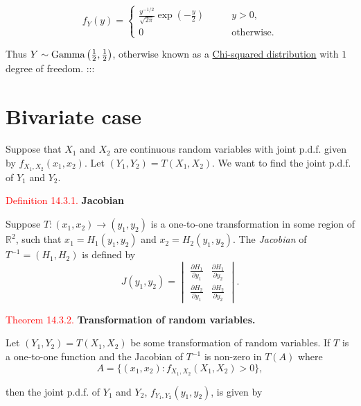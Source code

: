 \documentclass[
]{book}
\begin{document}
\[ f_Y (y) = \left\{ \begin{array}{ll} \frac{y^{-1/2}}{\sqrt{2 \pi}} \exp \left( - \frac{y}{2} \right) \qquad & y>0, \\
0 & \mbox{otherwise.} \end{array} \right.\]

Thus \(Y \sim {\rm Gamma} \left( \frac{1}{2},\frac{1}{2} \right)\), otherwise known as a \protect\hyperlink{rv:exponential:chi}{Chi-squared distribution} with \(1\) degree of freedom.
:::

\hypertarget{Transform:bivariate}{%
\section{Bivariate case}\label{Transform:bivariate}}

Suppose that \(X_1\) and \(X_2\) are continuous random variables with joint p.d.f. given by \(f_{X_1,X_2}(x_1,x_2)\). Let \((Y_1,Y_2)=T(X_1,X_2)\). We want to find the joint p.d.f. of \(Y_1\) and \(Y_2\).

\leavevmode{}%
\textcolor{red}{Definition 14.3.1.}
{\textbf{Jacobian}}

Suppose \(T:(x_1,x_2) \rightarrow (y_1,y_2)\) is a one-to-one transformation in some region of \(\mathbb{R}^2\), such that \(x_1 = H_1(y_1,y_2)\) and \(x_2 = H_2(y_1,y_2)\). The \emph{Jacobian} of \(T^{-1}=(H_1,H_2)\) is defined by\\

\[ J(y_1,y_2) = \begin{vmatrix} \frac{\partial H_1}{\partial y_1} & \frac{\partial H_1}{\partial y_2} \\[4pt]
\frac{\partial H_2}{\partial y_1} & \frac{\partial H_2}{\partial y_2} \end{vmatrix} .\]

\leavevmode{}%
\textcolor{red}{Theorem 14.3.2.}
{\textbf{Transformation of random variables.}}

Let \((Y_1,Y_2)=T(X_1,X_2)\) be some transformation of random variables. If \(T\) is a one-to-one function and the Jacobian of \(T^{-1}\) is non-zero in \(T(A)\) where\\

\[A=\{(x_1,x_2): f_{X_1,X_2}(X_1, X_2)>0\},\]

then the joint p.d.f. of \(Y_1\) and \(Y_2\), \(f_{Y_1,Y_2}(y_1,y_2)\), is given by\\
\end{document}
